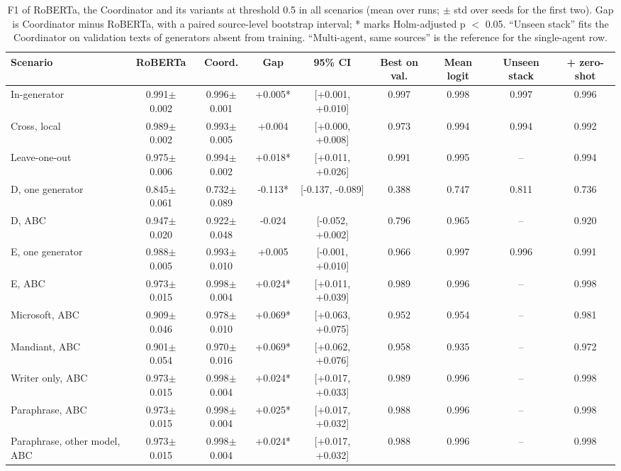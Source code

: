 \begin{table}[t]
\centering
\footnotesize\setlength{\tabcolsep}{3pt}
\caption{F1 of RoBERTa, the Coordinator and its variants at threshold 0.5 in all scenarios (mean over runs; $\pm$ std over seeds for the first two). Gap is Coordinator minus RoBERTa, with a paired source-level bootstrap interval; * marks Holm-adjusted p $<$ 0.05. ``Unseen stack'' fits the Coordinator on validation texts of generators absent from training. ``Multi-agent, same sources'' is the reference for the single-agent row.}
\label{tab:coordinator}
\begin{tabular}{@{}lcccccccc@{}}
\toprule
Scenario & RoBERTa & Coord. & Gap & 95\% CI & Best on val. & Mean logit & Unseen stack & + zero-shot \\
\midrule
In-generator & 0.991$\pm$0.002 & 0.996$\pm$0.001 & +0.005* & [+0.001, +0.010] & 0.997 & 0.998 & 0.997 & 0.996 \\
Cross, local & 0.989$\pm$0.002 & 0.993$\pm$0.005 & +0.004 & [+0.000, +0.008] & 0.973 & 0.994 & 0.994 & 0.992 \\
Leave-one-out & 0.975$\pm$0.006 & 0.994$\pm$0.002 & +0.018* & [+0.011, +0.026] & 0.991 & 0.995 & -- & 0.994 \\
D, one generator & 0.845$\pm$0.061 & 0.732$\pm$0.089 & -0.113* & [-0.137, -0.089] & 0.388 & 0.747 & 0.811 & 0.736 \\
D, ABC & 0.947$\pm$0.020 & 0.922$\pm$0.048 & -0.024 & [-0.052, +0.002] & 0.796 & 0.965 & -- & 0.920 \\
E, one generator & 0.988$\pm$0.005 & 0.993$\pm$0.010 & +0.005 & [-0.001, +0.010] & 0.966 & 0.997 & 0.996 & 0.991 \\
E, ABC & 0.973$\pm$0.015 & 0.998$\pm$0.004 & +0.024* & [+0.011, +0.039] & 0.989 & 0.996 & -- & 0.998 \\
Microsoft, ABC & 0.909$\pm$0.046 & 0.978$\pm$0.010 & +0.069* & [+0.063, +0.075] & 0.952 & 0.954 & -- & 0.981 \\
Mandiant, ABC & 0.901$\pm$0.054 & 0.970$\pm$0.016 & +0.069* & [+0.062, +0.076] & 0.958 & 0.935 & -- & 0.972 \\
Writer only, ABC & 0.973$\pm$0.015 & 0.998$\pm$0.004 & +0.024* & [+0.017, +0.033] & 0.989 & 0.996 & -- & 0.998 \\
Paraphrase, ABC & 0.973$\pm$0.015 & 0.998$\pm$0.004 & +0.025* & [+0.017, +0.032] & 0.988 & 0.996 & -- & 0.998 \\
Paraphrase, other model, ABC & 0.973$\pm$0.015 & 0.998$\pm$0.004 & +0.024* & [+0.017, +0.032] & 0.988 & 0.996 & -- & 0.998 \\

\end{tabular}
\end{table}
